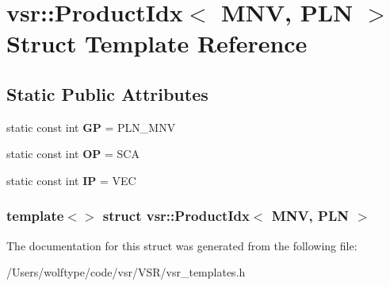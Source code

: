 \hypertarget{structvsr_1_1_product_idx_3_01_m_n_v_00_01_p_l_n_01_4}{\section{vsr\-:\-:Product\-Idx$<$ M\-N\-V, P\-L\-N $>$ Struct Template Reference}
\label{structvsr_1_1_product_idx_3_01_m_n_v_00_01_p_l_n_01_4}
}
\subsection*{Static Public Attributes}
\begin{DoxyCompactItemize}
\item 
\hypertarget{structvsr_1_1_product_idx_3_01_m_n_v_00_01_p_l_n_01_4_a2da250bf527117f613251b283413764b}{static const int {\bfseries G\-P} = P\-L\-N\-\_\-\-M\-N\-V}\label{structvsr_1_1_product_idx_3_01_m_n_v_00_01_p_l_n_01_4_a2da250bf527117f613251b283413764b}

\item 
\hypertarget{structvsr_1_1_product_idx_3_01_m_n_v_00_01_p_l_n_01_4_a3e07cf28721f82bb60765b06cccc89ee}{static const int {\bfseries O\-P} = S\-C\-A}\label{structvsr_1_1_product_idx_3_01_m_n_v_00_01_p_l_n_01_4_a3e07cf28721f82bb60765b06cccc89ee}

\item 
\hypertarget{structvsr_1_1_product_idx_3_01_m_n_v_00_01_p_l_n_01_4_ababac746cd4e8fca7f26c96907dd788d}{static const int {\bfseries I\-P} = V\-E\-C}\label{structvsr_1_1_product_idx_3_01_m_n_v_00_01_p_l_n_01_4_ababac746cd4e8fca7f26c96907dd788d}

\end{DoxyCompactItemize}
\subsubsection*{template$<$$>$ struct vsr\-::\-Product\-Idx$<$ M\-N\-V, P\-L\-N $>$}



The documentation for this struct was generated from the following file\-:\begin{DoxyCompactItemize}
\item 
/\-Users/wolftype/code/vsr/\-V\-S\-R/vsr\-\_\-templates.\-h\end{DoxyCompactItemize}
